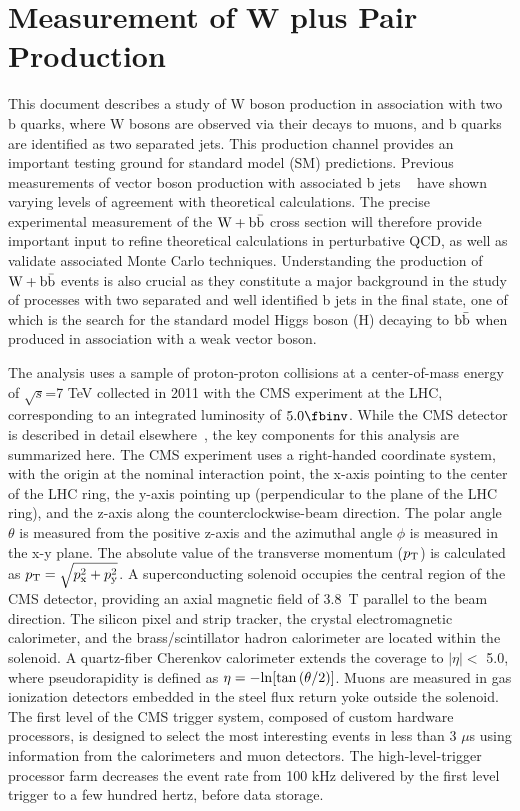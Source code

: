 \chapter{Measurement of W plus \bbbar Pair Production}
This document describes a study of W boson production
in association with two b quarks, where W bosons are observed via their decays to muons, and
b quarks are identified as two separated jets.
This production channel provides an important testing ground for 
standard model (SM) predictions. 
Previous
measurements of vector boson production with associated b jets
~\cite{Aaltonen:2009qi,D0:2012qt,Aad:2011kp} have shown varying levels of agreement with theoretical 
calculations.
The precise experimental measurement of the $\mathrm{W+\mathrm{b\bar{b}}}$ cross section will therefore provide important
input to refine theoretical calculations in perturbative QCD, as well as validate associated Monte Carlo techniques.
Understanding the  production of $\mathrm{W+\mathrm{b\bar{b}}}$ events is also crucial as they constitute a major background in the
study of processes with two 
separated and well identified b jets in the final state, one of which is
the search for the standard model Higgs boson (H) decaying to $\mathrm{b\bar{b}}$
when produced in association with a weak vector boson.

The analysis uses a sample of proton-proton collisions 
at a center-of-mass energy of $\sqrt{s}$=7 TeV collected in 2011 with the CMS experiment at the LHC, 
corresponding to an 
integrated luminosity of $5.0\fbinv$.
While the CMS detector is described in detail elsewhere~\cite{CMSExperiment}, the
key components for this analysis are summarized here.
The CMS experiment uses a right-handed coordinate system, with the
origin at the nominal interaction point, the x-axis
pointing to the center of the LHC ring, the y-axis pointing
up (perpendicular to the plane of the LHC ring), and the z-axis
along the counterclockwise-beam direction. The polar angle
$\theta$ is measured from the positive z-axis and the
azimuthal angle $\phi$ is measured in the x-y plane.
The absolute value of the transverse
momentum ($p_\mathrm{T}$) is calculated as 
$p_\mathrm{T} = \sqrt{p_{\rm{x}}^2 + p_{\rm{y}}^2}$.
A superconducting solenoid occupies the
central region of the CMS detector, providing an axial magnetic
field of 3.8~T parallel to the beam direction.
The silicon pixel and strip
tracker, the crystal electromagnetic calorimeter, and the brass/scintillator hadron
calorimeter are located within the solenoid. A quartz-fiber
Cherenkov calorimeter extends the coverage to $|\eta| <$ 5.0, where pseudorapidity
is defined as $\eta=-{\rm ln}[\tan{(\theta/2)}]$.
Muons are measured in gas ionization detectors embedded 
in the steel flux return yoke outside the solenoid.
The first level of the CMS trigger system, composed of custom
hardware processors, is designed to select the most interesting events
in less than 3 $\mu$s using information from the calorimeters and muon
detectors. 
The high-level-trigger processor farm decreases the event rate from 100 kHz
delivered by the first level trigger to a few hundred hertz, before data storage.

